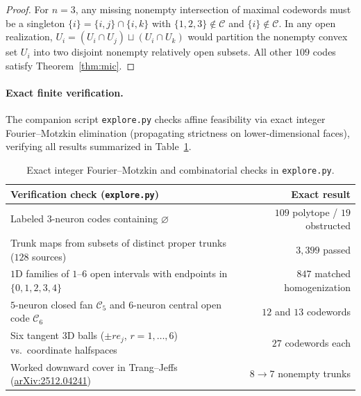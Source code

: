 \documentclass[11pt]{article}
\theoremstyle{plain}
\theoremstyle{definition}
\theoremstyle{remark}
\begin{document}
\begin{proof}
For $n = 3$, any missing nonempty intersection of maximal codewords must be a singleton $\{i\} = \{i, j\} \cap \{i, k\}$ with $\{1,2,3\} \notin \mathcal{C}$ and $\{i\} \notin \mathcal{C}$. In any open realization, $U_i = (U_i \cap U_j) \sqcup (U_i \cap U_k)$ would partition the nonempty convex set $U_i$ into two disjoint nonempty relatively open subsets. All other $109$ codes satisfy Theorem~\ref{thm:mic}.
\end{proof}

\paragraph{Exact finite verification.}
The companion script \texttt{explore.py} checks affine feasibility via exact integer Fourier--Motzkin elimination (propagating strictness on lower-dimensional faces), verifying all results summarized in Table~\ref{tab:checks}.

\begin{table}[ht]
\centering
\small
\begin{tabular}{@{}lr@{}}
\toprule
Verification check (\texttt{explore.py}) & Exact result \\
\midrule
Labeled $3$-neuron codes containing $\varnothing$ & $109$ polytope / $19$ obstructed \\
Trunk maps from subsets of distinct proper trunks ($128$ sources) & $3{,}399$ passed \\
$1$D families of $1$--$6$ open intervals with endpoints in $\{0,1,2,3,4\}$ & $847$ matched homogenization \\
$5$-neuron closed fan $\mathcal{C}_5$ and $6$-neuron central open code $\mathcal{C}_6$ & $12$ and $13$ codewords \\
Six tangent $3$D balls ($\pm r e_j$, $r = 1,\dots,6$) vs.\ coordinate halfspaces & $27$ codewords each \\
Worked downward cover in Trang--Jeffs (\href{https://arxiv.org/abs/2512.04241}{arXiv:2512.04241}) & $8 \to 7$ nonempty trunks \\
\bottomrule
\end{tabular}
\caption{Exact integer Fourier--Motzkin and combinatorial checks in \texttt{explore.py}.}\label{tab:checks}
\end{table}
\end{document}
